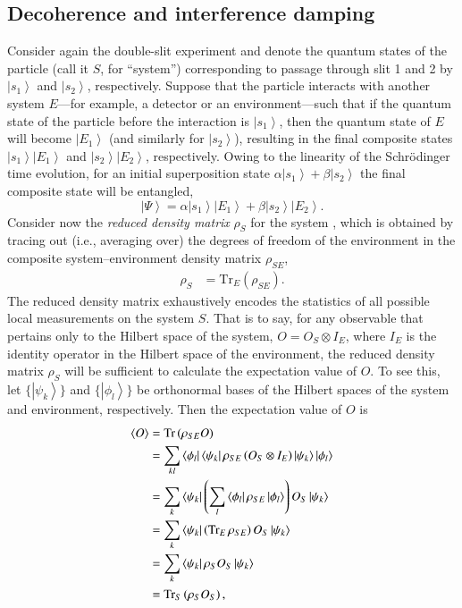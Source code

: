 \documentclass[3p,sort&compress]{elsarticle}
\newcommand{\bra}[1]{\left\langle{#1}\right\vert}
\newcommand{\ket}[1]{\left\vert{#1}\right\rangle}
\newcommand{\op}[1]{#1}
\begin{document}
\subsection{Decoherence and interference damping}

Consider again the double-slit experiment and denote the quantum states of the particle (call it $S$, for ``system'') corresponding to passage through slit 1 and 2 by $\ket{s_1}$ and $\ket{s_2}$, respectively. Suppose that the particle interacts with another system $E$---for example, a detector or an environment---such that if the quantum state of the particle before the interaction is $\ket{s_1}$, then the quantum state of $E$ will become $\ket{E_1}$ (and similarly for $\ket{s_2}$), resulting in the final composite states $\ket{s_1}\ket{E_1}$ and $\ket{s_2}\ket{E_2}$, respectively. Owing to the linearity of the Schr\"odinger time evolution, for an initial superposition state $\alpha\ket{s_1}+\beta\ket{s_2}$ the final composite state will be entangled,
%
\begin{equation}
\label{eq:1dlkf}
\ket{\Psi} = \alpha \ket{s_1} \ket{E_1} + \beta \ket{s_2} \ket{E_2}.
\end{equation}
%
Consider now the \emph{reduced density matrix} $\op{\rho}_S$ for the system \cite{Landau:1927:uy,Neumann:1932:gq,Furry:1936:pp}, which is obtained by tracing out (i.e., averaging over) the degrees of freedom of the environment in the composite system--environment density matrix $\op{\rho}_{SE}$,
%
\begin{align}
  \label{eq:aa12rm}
 \op{\rho}_S &= \text{Tr}_E(\op{\rho}_{SE}).
\end{align}
%
The reduced density matrix exhaustively encodes the statistics of all possible local measurements on the system $S$. That is to say, for any observable that pertains only to the Hilbert space of the system, $\op{O} = \op{O}_S\otimes \op{I}_E$, where $\op{I}_E$ is the identity operator in the Hilbert space of the environment, the reduced density matrix $\op{\rho}_S$ will be sufficient to calculate the expectation value of $\op{O}$. To see this, let $\{ \ket{\psi_k} \}$ and $\{ \ket{\phi_l} \}$ be orthonormal bases of the Hilbert spaces of the system and environment, respectively. Then the expectation value of $\op{O}$ is
%
\begin{align}
\label{eq:rcae}
\langle \op{O} \rangle &= \text{Tr} \, (\op{\rho}_{SE}\op{O})  \notag \\
&= \sum_{kl} \bra{\phi_l} \bra{\psi_k} \op{\rho}_{SE}
\left(\op{O}_S \otimes
\op{I}_E\right) \ket{\psi_k}  \ket{\phi_l} \notag \\
&= \sum_{k} \bra{\psi_k} \left( \sum_l \bra{\phi_l}
  \op{\rho}_{SE}
  \ket{\phi_l}  \right) \op{O}_S \ket{\psi_k} \notag \\
&= \sum_{k} \bra{\psi_k} \left( \text{Tr}_E \, \op{\rho}_{SE}
\right) \op{O}_S \ket{\psi_k} \notag \\
&= \sum_{k} \bra{\psi_k} \op{\rho}_S\op{O}_S
\ket{\psi_k} \notag \\
&= \text{Tr}_S \left( \op{\rho}_S
  \op{O}_S \right),
\end{align}
\end{document}
